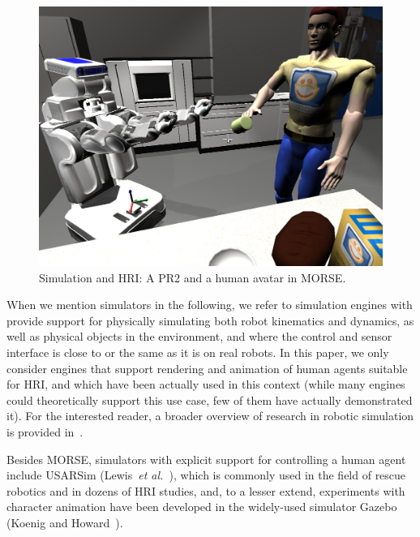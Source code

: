 \documentclass[conference]{IEEEtran}
\newcommand{\etal}{{\textit{et al.~}}}
\begin{document}
\begin{figure}[ht!]
      \centering 
      \includegraphics[width=0.9\linewidth]{morse_pr2.jpg}
      \caption{Simulation and HRI: A PR2 and a human avatar in MORSE.}
      \label{fig|morse-hri}
\end{figure}

When we mention simulators in the following, we refer to simulation engines with
provide support for physically simulating both robot kinematics and dynamics, as
well as physical objects in the environment, and where the control and sensor
interface is close to or the same as it is on real robots. In this paper,
we only consider engines that support rendering and animation of human
agents suitable for HRI, and which have been actually used in this context
(while many engines could theoretically support this use case, few of them have
actually demonstrated it). For the interested reader, a broader overview of
research in robotic simulation is provided in~\cite{Ando2010}.

Besides MORSE, simulators with explicit support for controlling a human agent
include USARSim (Lewis~\etal\cite{lewis2007usarsim}), which is commonly used in
the field of rescue robotics and in dozens of HRI studies, and, to a
lesser extend, experiments with character animation have been developed in the
widely-used simulator Gazebo (Koenig and Howard~\cite{Koenig2004}).


%
\end{document}
